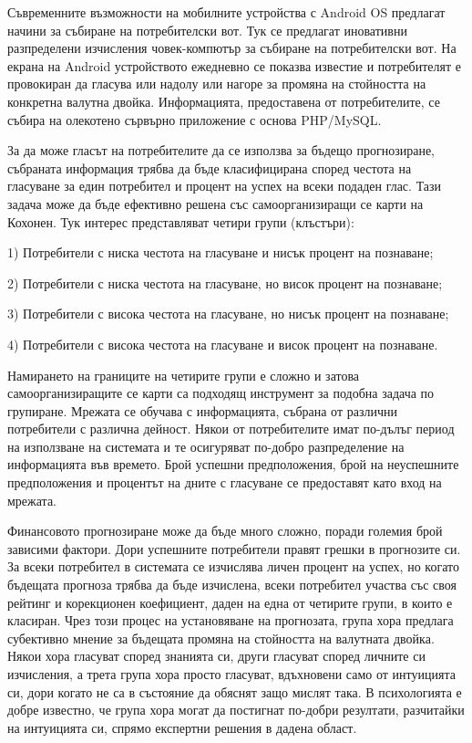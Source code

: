 Съвременните възможности на мобилните устройства с Android OS предлагат начини за събиране на потребителски вот. Тук се предлагат иновативни разпределени изчисления човек-компютър за събиране на потребителски вот. На екрана на Android устройството ежедневно се показва известие и потребителят е провокиран да гласува или
надолу или нагоре за промяна на стойността на конкретна валутна двойка. Информацията, предоставена от потребителите, се събира на олекотено сървърно приложение с основа PHP/MySQL.

За да може гласът на потребителите да се използва за бъдещо прогнозиране, събраната информация трябва да бъде класифицирана според честота на гласуване за един потребител и процент на успех на всеки подаден глас. Тази задача може да бъде ефективно решена със самоорганизиращи се карти на Кохонен. Тук интерес представляват четири групи (клъстъри):\pagebreak

1) Потребители с ниска честота на гласуване и нисък процент на познаване;

2) Потребители с ниска честота на гласуване, но висок процент на познаване;

3) Потребители с висока честота на гласуване, но нисък процент на познаване;

4) Потребители с висока честота на гласуване и висок процент на познаване.

Намирането на границите на четирите групи е сложно и затова самоорганизиращите се карти са подходящ инструмент за подобна задача по групиране. Мрежата се обучава с информацията, събрана от различни потребители с различна дейност. Някои от потребителите имат по-дълъг период на използване на системата и те осигуряват по-добро разпределение на информацията във времето. Брой успешни предположения, брой на неуспешните предположения и процентът на дните с гласуване се предоставят като вход на мрежата.

Финансовото прогнозиране може да бъде много сложно, поради големия брой зависими фактори. Дори успешните потребители правят грешки в прогнозите си. За всеки потребител в системата се изчислява личен процент на успех, но когато бъдещата прогноза трябва да бъде изчислена, всеки потребител участва със своя рейтинг и корекционен коефициент, даден на една от четирите групи, в които е класиран. Чрез този процес на установяване на прогнозата, група хора предлага субективно мнение за бъдещата промяна на стойността на валутната двойка. Някои хора гласуват според знанията си, други гласуват според личните си изчисления, а трета група хора просто гласуват, вдъхновени само от интуицията си, дори когато не са в състояние да обяснят защо мислят така. В психологията е добре известно, че група хора могат да постигнат по-добри резултати, разчитайки на интуицията си, спрямо експертни решения в дадена област.

